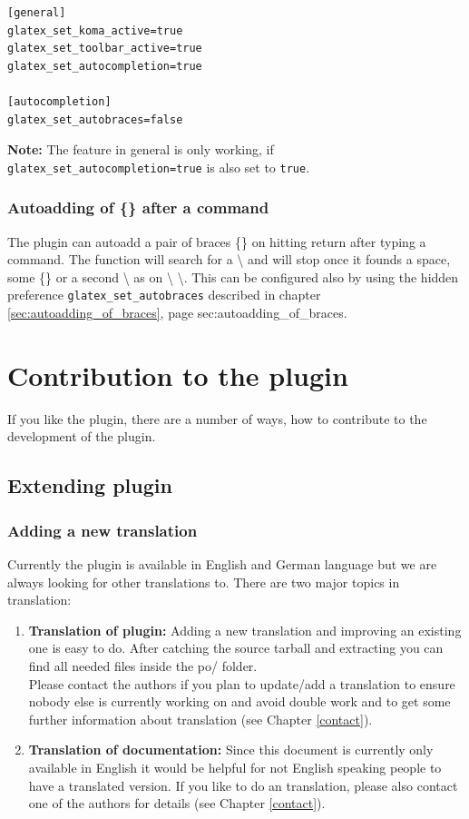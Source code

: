 \documentclass[%
paper=a4,%
fontsize=11pt,%
twoside=false,%
DIV18,%
headsepline,%
plainheadsepline,%
footsepline,%
plainfootsepline,%
bibliography=totoc,%
listof=totoc,%
BCOR10mm,%
parskip=half,%
openany,%
]{scrartcl}
\begin{document}
\begin{lstlisting}[caption={Configuration example for autocompletion of %
							\{\} after \_ and \symbol{94}}]
[general]
glatex_set_koma_active=true
glatex_set_toolbar_active=true
glatex_set_autocompletion=true

[autocompletion]
glatex_set_autobraces=false
\end{lstlisting}

\textbf{Note:} The feature in general is only working, if
\texttt{glatex\_set\_autocompletion=true} is also set to \texttt{true}.

\subsubsection{Autoadding of \{\} after a command}

The plugin can autoadd a pair of braces \{\} on hitting return after typing a
command. The function will search for a \textbackslash{} and will
stop once it founds a space, some \{\} or a second \textbackslash{}
as on \textbackslash{} \textbackslash{}. This can be configured also
by using the hidden preference \texttt{glatex\_set\_autobraces}
described in chapter \ref{sec:autoadding_of_braces}, page \pageref
{sec:autoadding_of_braces}.


\section{Contribution to the plugin}
If you like the plugin, there are a number of ways, how to
contribute to the development of the plugin.

\subsection{Extending plugin}

\subsubsection{Adding a new translation}
\label{sec:translating}
Currently the plugin is available in English and German language but
we are always looking for other translations to. There are two major
topics in translation:

\begin{enumerate}
\item \textbf{Translation of plugin:}
	   Adding a new translation and improving an existing one is easy to
	   do. After catching the source tarball and extracting you can find
	   all needed files inside the po/ folder. \\
	   Please contact the authors if you plan to update/add a translation
	   to ensure nobody else is currently working on and avoid double
	   work and to get some further information about translation (see
	   Chapter \ref{contact}).
\item \textbf{Translation of documentation:}
	   Since this document is currently only available in English it
	   would be helpful for not English speaking people to have a
	   translated version. If you like to do an translation, please
	   also contact one of the authors for details (see Chapter \ref{contact}).
\end{enumerate}
\end{document}
